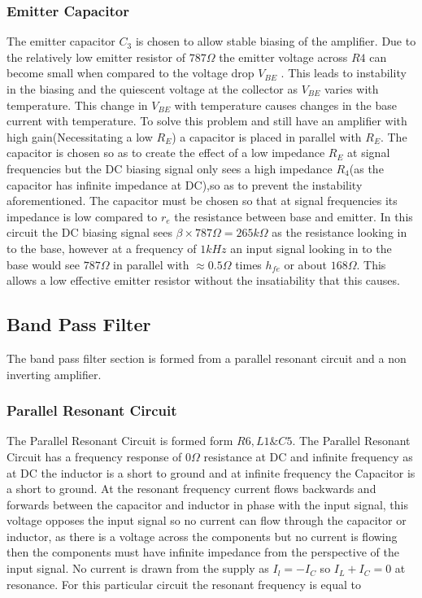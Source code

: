 \documentclass[10pt,a4paper]{article}
\begin{document}
\subsubsection{Emitter Capacitor}
The emitter capacitor $C_3$ is chosen to allow stable biasing of the amplifier. Due to the relatively low emitter resistor of $787\Omega$ the emitter voltage across $R4$ can become small when compared to the voltage drop $V_{BE}$ \cite{ArtElectronics}. This leads to instability in the biasing and the quiescent voltage at the collector as $V_{BE}$ varies with temperature. This change in $V_{BE}$ with temperature causes changes in the base current with temperature. To solve this problem and still have an amplifier with high gain(Necessitating a low $R_E$) a capacitor is placed in parallel with $R_E$. The capacitor is chosen so as to create the effect of a low impedance $R_E$ at signal frequencies but the DC biasing signal only sees a high impedance $R_4$(as the capacitor has infinite impedance at DC),so as to prevent the instability aforementioned. The capacitor must be chosen so that at signal frequencies its impedance is low compared to $r_e$ the resistance between base and emitter\cite{ArtElectronics}. In this circuit the DC biasing signal sees $\beta \times 787\Omega = 265k\Omega$ as the resistance looking in to the base, however at a frequency of $1kHz$ an input signal looking in to the base would see $787\Omega$ in parallel with $\approx 0.5\Omega$ times $h_{fe}$ or about $168\Omega$. This allows a low effective emitter resistor without the insatiability that this causes.  

\subsection{Band Pass Filter}   
The band pass filter section is formed from a parallel resonant circuit and a non inverting amplifier.

\subsubsection{Parallel Resonant Circuit}
The Parallel Resonant Circuit is formed form $R6,L1\&C5$. The Parallel Resonant Circuit has a frequency response of $0\Omega$ resistance at DC and infinite frequency as at DC the inductor is a short to ground and at infinite frequency the Capacitor is a short to ground. At the resonant frequency current flows backwards and forwards between the capacitor and inductor in phase with the input signal, this voltage opposes the input signal so no current can flow through the capacitor or inductor, as there is a voltage across the components but no current is flowing then the components must have infinite impedance from the perspective of the input signal. No current is drawn from the supply as $I_l = -I_C$ so $I_L + I_C = 0$ at resonance. For this particular circuit the resonant frequency is equal to
\end{document}
